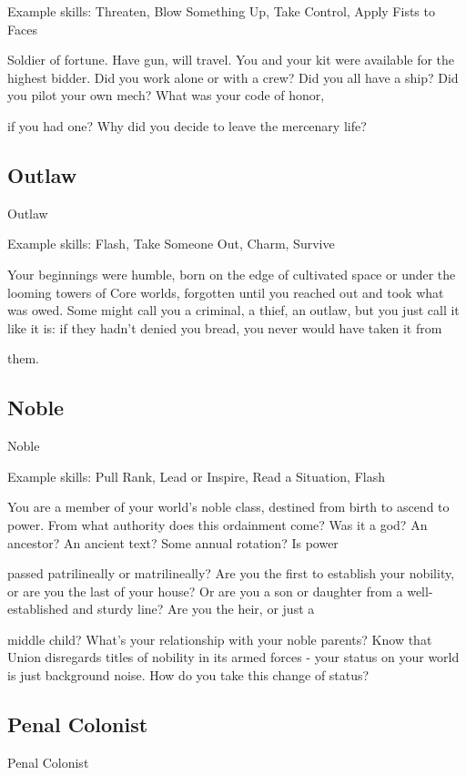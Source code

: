 Example skills: Threaten, Blow Something Up, Take Control, Apply Fists to Faces  

Soldier of fortune. Have gun, will travel. You and your kit were available for the highest bidder. Did you work  
alone or with a crew? Did you all have a ship? Did you pilot your own mech? What was your code of honor,  

if you had one? Why did you decide to leave the mercenary life?  
\subsection{Outlaw}
                                                       Outlaw  

Example skills: Flash, Take Someone Out, Charm, Survive  

Your beginnings were humble, born on the edge of cultivated space or under the looming towers of Core  
worlds, forgotten until you reached out and took what was owed. Some might call you a criminal, a thief, an  
outlaw, but you just call it like it is: if they hadn’t denied you bread, you never would have taken it from  

them.   
\subsection{Noble}
                                                        Noble  

Example skills: Pull Rank, Lead or Inspire, Read a Situation, Flash  

You are a member of your world’s noble class, destined from birth to ascend to power. From what authority  
does this ordainment come? Was it a god? An ancestor? An ancient text? Some annual rotation? Is power  

passed patrilineally or matrilineally? Are you the first to establish your nobility, or are you the last of your  
house? Or are you a son or daughter from a well-established and sturdy line? Are you the heir, or just a  

middle child? What’s your relationship with your noble parents? Know that Union disregards titles of  
nobility in its armed forces - your status on your world is just background noise. How do you take this  
change of status?  
 \subsection{Penal Colonist}

                                                 Penal Colonist  

